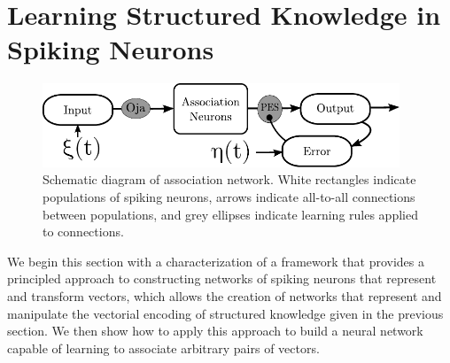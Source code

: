 \documentclass[10pt,letterpaper]{article}
\begin{document}

\section{Learning Structured Knowledge in Spiking Neurons}
\begin{figure}[htb]
\begin{center}
\includegraphics[height=25mm]{../diagrams/schematic.pdf}
\end{center}
\caption{Schematic diagram of association network. White rectangles indicate populations of spiking neurons, arrows indicate all-to-all connections between populations, and grey ellipses indicate learning rules applied to connections.}
\label{fig:schematic}
\end{figure}
We begin this section with a characterization of a framework that provides a principled approach to constructing networks of spiking neurons that represent and transform vectors, which allows the creation of networks that represent and manipulate the vectorial encoding of structured knowledge given in the previous section. We then show how to apply this approach to build a neural network capable of learning to associate arbitrary pairs of vectors.
\end{document}
